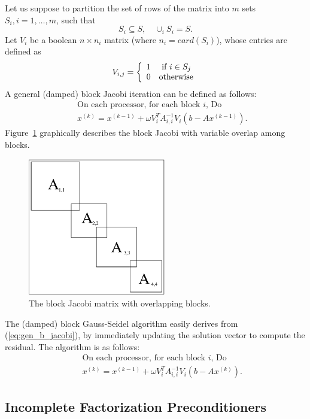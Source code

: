 Let us suppose to partition the set of rows of 
the matrix into $m$ sets $S_i, i=1, \ldots,m$, such that
\[
S_i \subseteq S, \quad \cup_i S_i = S.
\]
Let $V_i$ be a
boolean $n \times n_i$ matrix (where $n_i = card(S_i)$), whose entries are
defined as
\[
V_{i,j} = \left\{
\begin{array}{l l}
1 & \mbox{ if } i \in S_j \\
  0 & \mbox{otherwise}
\end{array}
  \right.
\]
A general (damped) block Jacobi iteration can be defined as follows:
\begin{eqnarray}
&& \mbox{On each processor, for each block $i$, Do} \\
&& \label{eq:gen_b_jacobi}
x^{(k)} = x^{(k-1)} + \omega V_i^T A_{i,i}^{-1} V_i(b - A x^{(k-1)}).
\end{eqnarray}
Figure~\ref{fig:bj} graphically describes the block Jacobi with variable
overlap among blocks.

\begin{figure}
\begin{center}
\includegraphics[width=6cm]{bj.eps}
\end{center}
\caption{The block Jacobi matrix with overlapping blocks.}
\label{fig:bj}
\end{figure}

The (damped) block Gauss-Seidel algorithm easily derives from
(\ref{eq:gen_b_jacobi}), by immediately updating the solution vector to
compute the residual. The algorithm is as follows:
\begin{eqnarray}
&& \mbox{On each processor, for each block $i$, Do} \\
&& \label{eq:gen_b_gs}
x^{(k)} = x^{(k-1)} + \omega V_i^T A_{i,i}^{-1} V_i(b - A x^{(k)}).
\end{eqnarray}

\subsection{Incomplete Factorization Preconditioners}
\label{sec:ilu}

